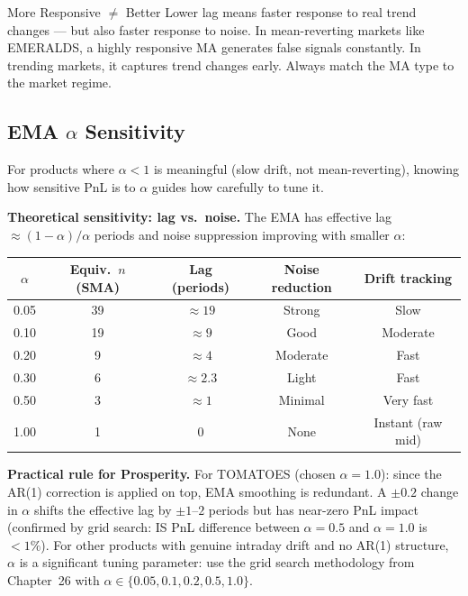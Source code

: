 \documentclass[12pt,a4paper,openany]{report}
\theoremstyle{definition}
\begin{document}
\begin{warningbox}{More Responsive $\neq$ Better}
Lower lag means faster response to real trend changes — but also faster response to noise. In mean-reverting markets like EMERALDS, a highly responsive MA generates false signals constantly. In trending markets, it captures trend changes early. Always match the MA type to the market regime.
\end{warningbox}

\subsection{EMA \texorpdfstring{$\alpha$}{alpha} Sensitivity}

For products where $\alpha < 1$ is meaningful (slow drift, not mean-reverting), knowing how sensitive PnL is to $\alpha$ guides how carefully to tune it.

\textbf{Theoretical sensitivity: lag vs.\ noise.} The EMA has effective lag $\approx (1-\alpha)/\alpha$ periods and noise suppression improving with smaller $\alpha$:

\begin{center}
\begin{tabular}{c|cccc}
\toprule
$\alpha$ & Equiv.\ $n$ (SMA) & Lag (periods) & Noise reduction & Drift tracking \\
\midrule
0.05 & 39 & $\approx 19$ & Strong & Slow \\
0.10 & 19 & $\approx 9$  & Good   & Moderate \\
0.20 & 9  & $\approx 4$  & Moderate & Fast \\
0.30 & 6  & $\approx 2.3$ & Light  & Fast \\
0.50 & 3  & $\approx 1$  & Minimal & Very fast \\
1.00 & 1  & 0           & None   & Instant (raw mid) \\
\bottomrule
\end{tabular}
\end{center}

\textbf{Practical rule for Prosperity.} For TOMATOES (chosen $\alpha = 1.0$): since the AR(1) correction is applied on top, EMA smoothing is redundant. A $\pm 0.2$ change in $\alpha$ shifts the effective lag by $\pm 1$--$2$ periods but has near-zero PnL impact (confirmed by grid search: IS PnL difference between $\alpha = 0.5$ and $\alpha = 1.0$ is $< 1\%$). For other products with genuine intraday drift and no AR(1) structure, $\alpha$ is a significant tuning parameter: use the grid search methodology from Chapter~26 with $\alpha \in \{0.05, 0.1, 0.2, 0.5, 1.0\}$.
\end{document}
